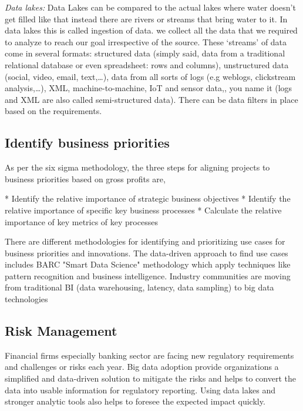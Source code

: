 \documentclass[sigconf]{acmart}
\begin{document}
\textit{Data lakes:} Data Lakes can be compared to the actual lakes where water doesn't get filled like that instead there are rivers or streams that bring water to it. In data lakes this is called ingestion of data. we collect all the data that we required to analyze to reach our goal irrespective of the source. These ‘streams’ of data come in several formats: structured data (simply said, data from a traditional relational database or even spreadsheet: rows and columns), unstructured data (social, video, email, text,…), data from all sorts of logs (e.g weblogs, clickstream analysis,…), XML, machine-to-machine, IoT and sensor data,, you name it (logs and XML are also called semi-structured data). There can be data filters in place based on the requirements.



\subsection{Identify business priorities}
As per the six sigma methodology, the three steps for aligning projects to business priorities based on gross profits are, 

    * Identify the relative importance of strategic business objectives
    * Identify the relative importance of specific key business processes
    * Calculate the relative importance of key metrics of key processes
    
There are different methodologies for identifying and prioritizing use cases for business priorities and innovations. The data-driven approach to find use cases includes BARC "Smart Data Science" methodology which apply techniques like pattern recognition and business intelligence. Industry communities are moving from traditional BI (data warehousing, latency, data sampling) to big data technologies
    
\subsection{Risk Management}
Financial firms especially banking sector are facing new regulatory requirements and challenges or risks each year. Big data adoption provide organizations a simplified and data-driven solution to mitigate the risks and helps to convert the data into usable information for regulatory reporting. Using data lakes and stronger analytic tools   also helps to foresee the expected impact quickly.
\end{document}
